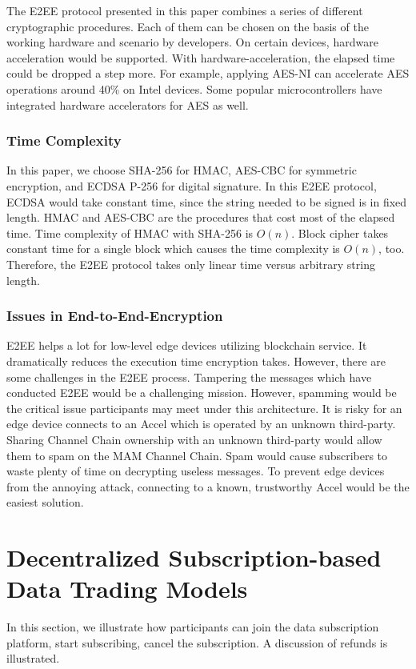 \documentclass[10pt, conference, compsocconf]{IEEEtran}
\begin{document}
The E2EE protocol presented in this paper combines a series of different cryptographic procedures. Each of them can be chosen on the basis of the working hardware and scenario by developers. On certain devices, hardware acceleration would be supported. With hardware-acceleration, the elapsed time could be dropped a step more. For example, applying AES-NI can accelerate AES operations around 40\% on Intel devices.\cite{AES-NI-Acceleration} Some popular microcontrollers have integrated hardware accelerators for AES as well.\cite{stm}

\subsubsection{Time Complexity}
In this paper, we choose SHA-256 for HMAC, AES-CBC for symmetric encryption, and ECDSA P-256 for digital signature. In this E2EE protocol, ECDSA would take constant time, since the string needed to be signed is in fixed length. HMAC and AES-CBC are the procedures that cost most of the elapsed time. Time complexity of HMAC with SHA-256 is $O(n)$.\cite{hmac_time_complexity} Block cipher takes constant time for a single block which causes the time complexity is $O(n)$, too. Therefore, the E2EE protocol takes only linear time versus arbitrary string length.

\subsubsection{Issues in End-to-End-Encryption}
E2EE helps a lot for low-level edge devices utilizing blockchain service. It dramatically reduces the execution time encryption takes. However, there are some challenges in the E2EE process. Tampering the messages which have conducted E2EE would be a challenging mission. However, spamming would be the critical issue participants may meet under this architecture. It is risky for an edge device connects to an Accel which is operated by an unknown third-party. Sharing Channel Chain ownership with an unknown third-party would allow them to spam on the MAM Channel Chain. Spam would cause subscribers to waste plenty of time on decrypting useless messages. To prevent edge devices from the annoying attack, connecting to a known, trustworthy Accel would be the easiest solution.

\section{Decentralized Subscription-based Data Trading Models}
\label{section:trading_model}
In this section, we illustrate how participants can join the data subscription platform, start subscribing, cancel the subscription. A discussion of refunds is illustrated.
\end{document}

